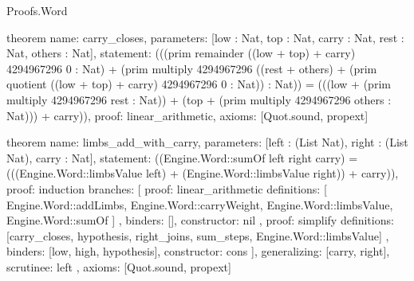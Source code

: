 \begin{lexlean}{Proofs.Word}
\begin{semanticmodule}
theorem{
  name: carry_closes,
  parameters: [low : Nat, top : Nat, carry : Nat, rest : Nat, others : Nat],
  statement: (((prim remainder ((low + top) + carry) 4294967296 0 : Nat) + (prim multiply 4294967296 ((rest + others) + (prim quotient ((low + top) + carry) 4294967296 0 : Nat)) : Nat)) = (((low + (prim multiply 4294967296 rest : Nat)) + (top + (prim multiply 4294967296 others : Nat))) + carry)),
  proof: linear_arithmetic{},
  axioms: [Quot.sound, propext]
}

theorem{
  name: limbs_add_with_carry,
  parameters: [left : (List Nat), right : (List Nat), carry : Nat],
  statement: ((Engine.Word::sumOf left right carry) = (((Engine.Word::limbsValue left) + (Engine.Word::limbsValue right)) + carry)),
  proof: induction{
    branches: [
      {
        proof: linear_arithmetic{
          definitions: [
            Engine.Word::addLimbs,
            Engine.Word::carryWeight,
            Engine.Word::limbsValue,
            Engine.Word::sumOf
          ]
        },
        binders: [],
        constructor: nil
      },
      {
        proof: simplify{
          definitions: [carry_closes, hypothesis, right_joins, sum_steps, Engine.Word::limbsValue]
        },
        binders: [low, high, hypothesis],
        constructor: cons
      }
    ],
    generalizing: [carry, right],
    scrutinee: left
  },
  axioms: [Quot.sound, propext]
}
\end{semanticmodule}
\end{lexlean}
